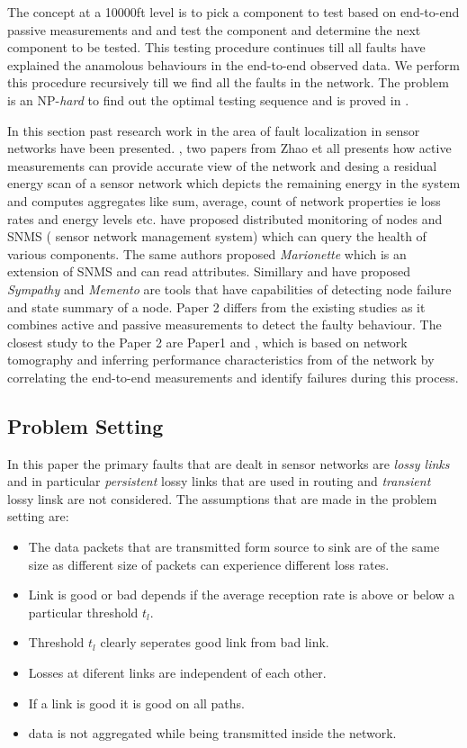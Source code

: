 \documentclass[10pt]{sigplan-proc-varsize}
\begin{document}
The concept at a 10000ft level is to pick a component to test based on end-to-end passive measurements and and test the component and determine the next component to be tested. This testing procedure continues till all faults have explained the anamolous behaviours in the end-to-end observed data. We perform this procedure recursively till we find all the faults in the network. The problem is an NP-{\it hard} to find out the optimal testing sequence and is proved in \cite{krishna:12}.

In this section past research work in the area of fault localization in sensor networks have been presented.  \cite{Zhao:02}, \cite{Zhao:03}  two papers from Zhao et all presents how active measurements can provide accurate view of the network and desing a residual energy scan of a sensor network which depicts the remaining energy in the system \cite{Zhao:02} and \cite{Zhao:03} computes aggregates like sum, average, count of network properties ie loss rates and energy levels etc. \cite{Hsin:02} have proposed distributed monitoring of nodes and \cite{Tolle:05} SNMS ( sensor network management system) which can query the health of various components. The same authors \cite{Tolle:06} proposed {\it Marionette} which is an extension of SNMS and can read attributes. Simillary \cite{Ramanathan:05} and \cite{Rost:06} have proposed {\it Sympathy} and {\it Memento} are tools that have capabilities of detecting node failure and state summary of a node. Paper 2 differs from the existing studies as it combines active and passive measurements to detect the faulty behaviour. The closest study to the Paper 2 are Paper1\cite{pclee:07} and \cite{Duff:06}, which is based on network tomography and inferring performance characteristics from of the network by correlating the end-to-end measurements and identify failures during this process. 

\subsection{Problem Setting}
In this paper the primary faults that are dealt in sensor networks are {\it lossy links} and in particular {\it persistent} lossy links that are used in routing and {\it transient} lossy linsk are not considered. The assumptions that are made in the problem setting are:

\begin{itemize}
  \item The data packets that are transmitted form source to sink are of the same size as different size of packets can experience different loss rates.
  \item Link is good or bad depends if the average reception rate is above or below a particular threshold $t_l$.
  \item Threshold $t_l$ clearly seperates good link from bad link.
  \item Losses at diferent links are independent of each other. 
  \item If a link is  good it is good on all paths.
\item data is not aggregated while being transmitted inside the network.
\end{itemize}
\end{document}
